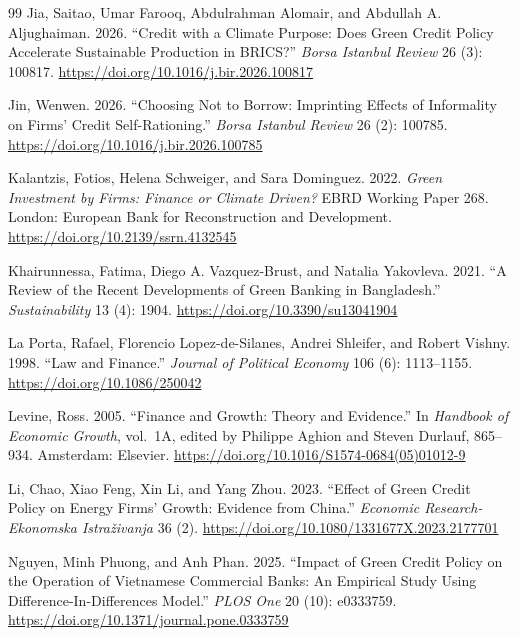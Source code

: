 \begin{thebibliography}{99}
Jia, Saitao, Umar Farooq, Abdulrahman Alomair, and Abdullah A. Aljughaiman. 2026. ``Credit with a Climate Purpose: Does Green Credit Policy Accelerate Sustainable Production in {BRICS}?'' \emph{Borsa Istanbul Review} 26 (3): 100817. \url{https://doi.org/10.1016/j.bir.2026.100817}

Jin, Wenwen. 2026. ``Choosing Not to Borrow: Imprinting Effects of Informality on Firms' Credit Self-Rationing.'' \emph{Borsa Istanbul Review} 26 (2): 100785. \url{https://doi.org/10.1016/j.bir.2026.100785}

Kalantzis, Fotios, Helena Schweiger, and Sara Dominguez. 2022. \emph{Green Investment by Firms: Finance or Climate Driven?} EBRD Working Paper 268. London: European Bank for Reconstruction and Development. \url{https://doi.org/10.2139/ssrn.4132545}

Khairunnessa, Fatima, Diego A. Vazquez-Brust, and Natalia Yakovleva. 2021. ``A Review of the Recent Developments of Green Banking in {Bangladesh}.'' \emph{Sustainability} 13 (4): 1904. \url{https://doi.org/10.3390/su13041904}

La Porta, Rafael, Florencio Lopez-de-Silanes, Andrei Shleifer, and Robert Vishny. 1998. ``Law and Finance.'' \emph{Journal of Political Economy} 106 (6): 1113--1155. \url{https://doi.org/10.1086/250042}

Levine, Ross. 2005. ``Finance and Growth: Theory and Evidence.'' In \emph{Handbook of Economic Growth}, vol.~1A, edited by Philippe Aghion and Steven Durlauf, 865--934. Amsterdam: Elsevier. \url{https://doi.org/10.1016/S1574-0684(05)01012-9}

Li, Chao, Xiao Feng, Xin Li, and Yang Zhou. 2023. ``Effect of Green Credit Policy on Energy Firms' Growth: Evidence from {China}.'' \emph{Economic Research-Ekonomska Istra{\v{z}}ivanja} 36 (2). \url{https://doi.org/10.1080/1331677X.2023.2177701}

Nguyen, Minh Phuong, and Anh Phan. 2025. ``Impact of Green Credit Policy on the Operation of {Vietnamese} Commercial Banks: An Empirical Study Using Difference-In-Differences Model.'' \emph{PLOS One} 20 (10): e0333759. \url{https://doi.org/10.1371/journal.pone.0333759}


\end{thebibliography}
